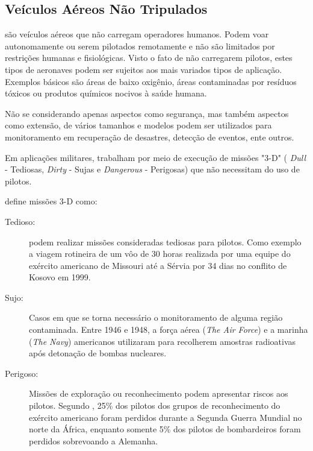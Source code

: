 \subsection{Veículos Aéreos Não Tripulados}

\vants são veículos aéreos que não carregam operadores humanos. Podem voar autonomamente ou serem pilotados remotamente e
não são limitados por restrições humanas e fisiológicas. Visto o fato de não carregarem pilotos, estes tipos de aeronaves podem ser sujeitos aos mais variados tipos de aplicação.
Exemplos básicos são áreas de baixo oxigênio, áreas contaminadas por resíduos tóxicos ou produtos químicos nocivos à saúde humana.

Não se considerando apenas aspectos como segurança, mas também aspectos como extensão, \vants de vários tamanhos e modelos podem ser utilizados para monitoramento em 
recuperação de desastres, detecção de eventos, ente outros. 

Em aplicações militares, \vants trabalham por meio de execução de missões "3-D" ( \emph{Dull} - Tediosas, \emph{Dirty} - Sujas e \emph{Dangerous} - Perigosas) que não necessitam do uso de pilotos.\cite{Bone2003}

\cite{uav_roadmap2005} define missões 3-D como:
\begin{description}
\item[Tedioso: ]
\vants podem realizar missões consideradas tediosas para pilotos. Como exemplo a viagem rotineira de um vôo de 30 horas realizada por uma equipe do exército americano de Missouri até a Sérvia por 34 dias no conflito de Kosovo em 1999. \cite{uav_roadmap2005}

\item[Sujo: ]
Casos em que se torna necessário o monitoramento de alguma região contaminada. Entre 1946 e 1948, a força aérea (\emph{The Air Force}) e a marinha (\emph{The Navy}) americanos utilizaram \vants para recolherem amostras radioativas após detonação de bombas nucleares. \cite{uav_roadmap2005}

\item[Perigoso: ]
Missões de exploração ou reconhecimento podem apresentar riscos aos pilotos. Segundo \cite{uav_roadmap2005}, 25\%  dos pilotos dos grupos de reconhecimento do exército americano foram perdidos durante a Segunda Guerra Mundial no norte da África, enquanto somente 5\% dos pilotos de bombardeiros foram perdidos sobrevoando a Alemanha.

\end{description}

